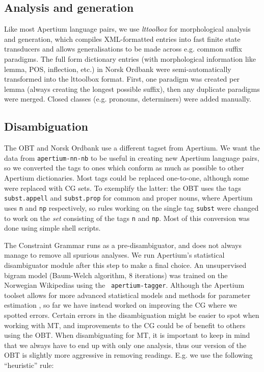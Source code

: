 \documentclass[11pt]{article}
\begin{document}
\subsection{Analysis and generation}

Like most Apertium language pairs, we use \emph{lttoolbox} for
morphological analysis and generation, which compiles XML-formatted
entries into fast finite state transducers and allows generalisations
to be made across e.g. common suffix paradigms. The full form
dictionary entries (with morphological information like lemma, POS,
inflection, etc.) in Norsk Ordbank were semi-automatically transformed
into the lttoolbox format. First, one paradigm was created per lemma
(always creating the longest possible suffix), then any duplicate
paradigms were merged. Closed classes (e.g. pronouns, determiners) were
added manually.

\subsection{Disambiguation}

The OBT and Norsk Ordbank use a different tagset from Apertium. We
want the data from {\tt \small apertium-nn-nb} to be useful in
creating new Apertium language pairs, so we converted the tags to ones
which conform as much as possible to other Apertium dictionaries. Most
tags could be replaced one-to-one, although some were replaced with CG
sets. To exemplify the latter: the OBT uses the tags {\tt \small
  subst.appell} and {\tt \small subst.prop} for common and proper
nouns, where Apertium uses {\tt \small n} and {\tt \small np}
respectively, so rules working on the single tag {\tt \small subst}
were changed to work on the \emph{set} consisting of the tags {\tt \small n}
and {\tt \small np}. Most of this conversion was done using simple
shell scripts.

The Constraint Grammar runs as a pre-disambiguator, and does not
always manage to remove all spurious analyses. We run Apertium's
statistical disambiguator module after this step to make a final
choice. An unsupervised bigram model (Baum-Welch algorithm, 8
iterations) was trained on the Norwegian Wikipedias using the {\tt
  \small apertium-tagger}. Although the Apertium toolset allows for
more advanced statistical models \citep{sheikh2009trigram} and methods
for parameter estimation \citep{sanchez2008utl}, so far we have
instead worked on improving the CG where we spotted errors. Certain
errors in the disambiguation might be easier to spot when working with
MT, and improvements to the CG could be of benefit to
others using the OBT. When disambiguating for MT, it
is important to keep in mind that we always have to end up with only
one analysis, thus our version of the OBT is slightly more aggressive
in removing readings. E.g. we use the following ``heuristic'' rule:
\end{document}
